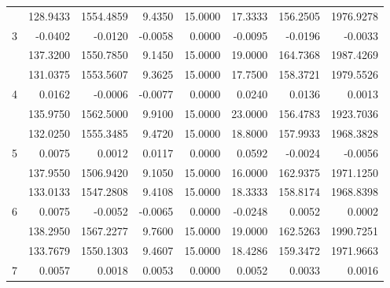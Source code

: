 \begin{table}[htb]
{\begin{tabular}{c|r|r|r|r|r|r|r}
 & 128.9433 & 1554.4859 & 9.4350 & 15.0000 & 17.3333 & 156.2505 & 1976.9278 \\ \cline{2-8} 
\multirow{-3}{*}{3} & \cellcolor[HTML]{ADDDAD}-0.0402 & \cellcolor[HTML]{ADDDAD}-0.0120 & \cellcolor[HTML]{ADDDAD}-0.0058 & \cellcolor[HTML]{ADDDAD}0.0000 & \cellcolor[HTML]{ADDDAD}-0.0095 & \cellcolor[HTML]{ADDDAD}-0.0196 & \cellcolor[HTML]{ADDDAD}-0.0033 \\ \hline
 & 137.3200 & 1550.7850 & 9.1450 & 15.0000 & 19.0000 & 164.7368 & 1987.4269 \\ \cline{2-8} 
 & 131.0375 & 1553.5607 & 9.3625 & 15.0000 & 17.7500 & 158.3721 & 1979.5526 \\ \cline{2-8} 
\multirow{-3}{*}{4} & \cellcolor[HTML]{ADDDAD}0.0162 & \cellcolor[HTML]{ADDDAD}-0.0006 & \cellcolor[HTML]{ADDDAD}-0.0077 & \cellcolor[HTML]{ADDDAD}0.0000 & \cellcolor[HTML]{ADDDAD}0.0240 & \cellcolor[HTML]{ADDDAD}0.0136 & \cellcolor[HTML]{ADDDAD}0.0013 \\ \hline
 & 135.9750 & 1562.5000 & 9.9100 & 15.0000 & 23.0000 & 156.4783 & 1923.7036 \\ \cline{2-8} 
 & 132.0250 & 1555.3485 & 9.4720 & 15.0000 & 18.8000 & 157.9933 & 1968.3828 \\ \cline{2-8} 
\multirow{-3}{*}{5} & \cellcolor[HTML]{ADDDAD}0.0075 & \cellcolor[HTML]{ADDDAD}0.0012 & \cellcolor[HTML]{ADDDAD}0.0117 & \cellcolor[HTML]{ADDDAD}0.0000 & 0.0592 & \cellcolor[HTML]{ADDDAD}-0.0024 & \cellcolor[HTML]{ADDDAD}-0.0056 \\ \hline
 & 137.9550 & 1506.9420 & 9.1050 & 15.0000 & 16.0000 & 162.9375 & 1971.1250 \\ \cline{2-8} 
 & 133.0133 & 1547.2808 & 9.4108 & 15.0000 & 18.3333 & 158.8174 & 1968.8398 \\ \cline{2-8} 
\multirow{-3}{*}{6} & \cellcolor[HTML]{ADDDAD}0.0075 & \cellcolor[HTML]{ADDDAD}-0.0052 & \cellcolor[HTML]{ADDDAD}-0.0065 & \cellcolor[HTML]{ADDDAD}0.0000 & \cellcolor[HTML]{ADDDAD}-0.0248 & \cellcolor[HTML]{ADDDAD}0.0052 & \cellcolor[HTML]{ADDDAD}0.0002 \\ \hline
 & 138.2950 & 1567.2277 & 9.7600 & 15.0000 & 19.0000 & 162.5263 & 1990.7251 \\ \cline{2-8} 
 & \cellcolor[HTML]{FFCE93}133.7679 & \cellcolor[HTML]{FFCE93}1550.1303 & \cellcolor[HTML]{FFCE93}9.4607 & \cellcolor[HTML]{FFCE93}15.0000 & \cellcolor[HTML]{FFCE93}18.4286 & \cellcolor[HTML]{FFCE93}159.3472 & \cellcolor[HTML]{FFCE93}1971.9663 \\ \cline{2-8} 
\multirow{-3}{*}{7} & \cellcolor[HTML]{ADDDAD}0.0057 & \cellcolor[HTML]{ADDDAD}0.0018 & \cellcolor[HTML]{ADDDAD}0.0053 & \cellcolor[HTML]{ADDDAD}0.0000 & \cellcolor[HTML]{ADDDAD}0.0052 & \cellcolor[HTML]{ADDDAD}0.0033 & \cellcolor[HTML]{ADDDAD}0.0016 \\ \hline
\end{tabular}%
}
\end{table}

